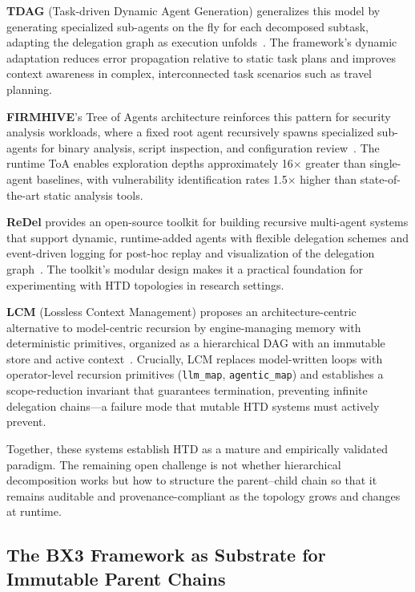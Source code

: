 \textbf{TDAG} (Task-driven Dynamic Agent Generation) generalizes this model by generating specialized sub-agents on the fly for each decomposed subtask, adapting the delegation graph as execution unfolds~\cite{tdag2024}. The framework's dynamic adaptation reduces error propagation relative to static task plans and improves context awareness in complex, interconnected task scenarios such as travel planning.

\textbf{FIRMHIVE}'s Tree of Agents architecture reinforces this pattern for security analysis workloads, where a fixed root agent recursively spawns specialized sub-agents for binary analysis, script inspection, and configuration review~\cite{firmhive2024}. The runtime ToA enables exploration depths approximately 16$\times$ greater than single-agent baselines, with vulnerability identification rates 1.5$\times$ higher than state-of-the-art static analysis tools.

\textbf{ReDel} provides an open-source toolkit for building recursive multi-agent systems that support dynamic, runtime-added agents with flexible delegation schemes and event-driven logging for post-hoc replay and visualization of the delegation graph~\cite{redel2024}. The toolkit's modular design makes it a practical foundation for experimenting with HTD topologies in research settings.

\textbf{LCM} (Lossless Context Management) proposes an architecture-centric alternative to model-centric recursion by engine-managing memory with deterministic primitives, organized as a hierarchical DAG with an immutable store and active context~\cite{lcm2025}. Crucially, LCM replaces model-written loops with operator-level recursion primitives (\texttt{llm\_map}, \texttt{agentic\_map}) and establishes a scope-reduction invariant that guarantees termination, preventing infinite delegation chains---a failure mode that mutable HTD systems must actively prevent.

Together, these systems establish HTD as a mature and empirically validated paradigm. The remaining open challenge is not whether hierarchical decomposition works but how to structure the parent--child chain so that it remains auditable and provenance-compliant as the topology grows and changes at runtime.

\subsection{The BX3 Framework as Substrate for Immutable Parent Chains}
\label{sec:bx3}

